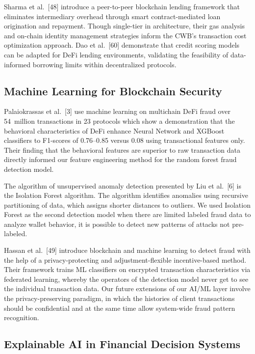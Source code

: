 \documentclass[12pt,a4paper]{report}
\begin{document}
Sharma et al.~[48] introduce a peer-to-peer blockchain lending framework that eliminates intermediary overhead through smart contract-mediated loan origination and repayment. Though single-tier in architecture, their gas analysis and on-chain identity management strategies inform the CWB's transaction cost optimization approach. Dao et al.~[60] demonstrate that credit scoring models can be adapted for DeFi lending environments, validating the feasibility of data-informed borrowing limits within decentralized protocols.

\subsection{Machine Learning for Blockchain Security}

Palaiokrassas et al.~[3] use machine learning on multichain DeFi fraud over 54~million transactions in 23 protocols which show a demonstration that the behavioral characteristics of DeFi enhance Neural Network and XGBoost classifiers to F1-scores of 0.76--0.85 versus 0.08 using transactional features only. Their finding that the behavioral features are superior to raw transaction data directly informed our feature engineering method for the random forest fraud detection model.

The algorithm of unsupervised anomaly detection presented by Liu et al.~[6] is the Isolation Forest algorithm. The algorithm identifies anomalies using recursive partitioning of data, which assigns shorter distances to outliers. We used Isolation Forest as the second detection model when there are limited labeled fraud data to analyze wallet behavior, it is possible to detect new patterns of attacks not pre-labeled.

Hassan et al.~[49] introduce blockchain and machine learning to detect fraud with the help of a privacy-protecting and adjustment-flexible incentive-based method. Their framework trains ML classifiers on encrypted transaction characteristics via federated learning, whereby the operators of the detection model never get to see the individual transaction data. Our future extensions of our AI/ML layer involve the privacy-preserving paradigm, in which the histories of client transactions should be confidential and at the same time allow system-wide fraud pattern recognition.

\subsection{Explainable AI in Financial Decision Systems}
\end{document}
